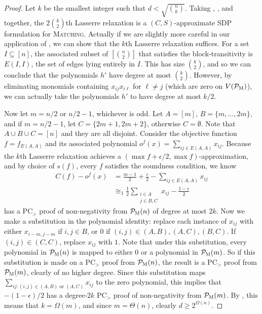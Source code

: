 \begin{proof}
Let $k$ be the smallest integer such that $d < \sqrt{\binom{n}{k}}$. Taking , , and  together, the $2\binom{k}{2}$th Lasserre relaxation is a $(C,S)$-approximate SDP formulation for \textsc{Matching}. Actually if we are slightly more careful in our application of , we can show that the $k$th Lasserre relaxation suffices. For a set $I \subseteq [n]$, the associated subset of $\left[\binom{n}{2}\right]$ that satisfies the block-transitivity is $E(I,I)$, the set of edges lying entirely in $I$. This has size $\binom{k}{2}$, and so we can conclude that the polynomials $h'$ have degree at most $\binom{k}{2}$. However, by eliminating monomials containing $x_{ij}x_{i\ell}$ for $\ell \neq j$ (which are zero on $V(\mathcal P_{\textsc{M}})$), we can actually take the polynomials $h'$ to have degree at most $k/2$. 

Now let $m = n/2$ or $n/2-1$, whichever is odd. Let $A = [m]$, $B = \{m,\dots, 2m\}$, and if $m = n/2-1$, let $C = \{2m+1,2m+2\}$, otherwise $C = \emptyset$. Note that $A \cup B \cup C = [n]$ and they are all disjoint. Consider the objective function $f = f_{E(A,A)}$ and its associated polynomial $o^f(x) = \sum_{ij \in E(A,A)} x_{ij}$. Because the $k$th Lasserre relaxation achieves a $(\max f + \epsilon/2,\max f)$-approximation, and by choice of $s(f)$, every $f$ satisfies the soundness condition, we know
\begin{align*}
C(f) - o^f(x) &= \frac{m-1}{2} + \frac{\epsilon}{2} - \sum_{ij \in E(A,A)} x_{ij} \\
&\cong_1 \frac{1}{2}\sum_{\substack{i \in A \\ j \in B,C}} x_{ij} - \frac{1-\epsilon}{2}
\end{align*}
has a PC$_>$ proof of non-negativity from $\mathcal P_{\textsc{M}}(n)$ of degree at most $2k$. Now we make a substitution in the polynomial identity: replace each instance of $x_{ij}$ with either $x_{i-m, j-m}$ if $i,j \in B$, or $0$ if $(i,j) \in (A,B), (A,C), (B,C)$. If $(i,j) \in (C,C)$, replace $x_{ij}$ with $1$. Note that under this substitution, every polynomial in $\mathcal P_{\textsc{M}}(n)$ is mapped to either $0$ or a polynomial in $\mathcal P_{\textsc{M}}(m)$. So if this substitution is made on a PC$_>$ proof from $\mathcal P_{\textsc{M}}(n)$, the result is a PC$_>$ proof from $\mathcal P_{\textsc{M}}(m)$, clearly of no higher degree. Since this substitution maps $\sum_{ij: (i,j) \in (A,B) \text{ or } (A,C)} x_{ij}$ to the zero polynomial, this implies that $-(1-\epsilon)/2$ has a degree-$2k$ PC$_>$ proof of non-negativity from $\mathcal P_{\textsc{M}}(m)$. By , this means that $k = \Omega(m)$, and since $m = \Theta(n)$, clearly $d \geq 2^{\Omega(n)}$.
\end{proof}
